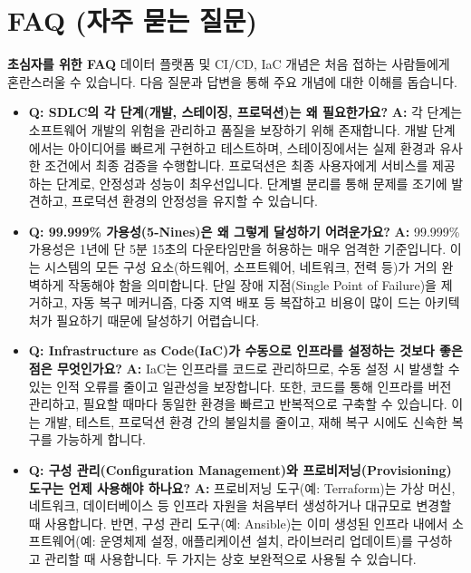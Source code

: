 \documentclass[11pt,a4paper]{article}
\begin{document}
\newpage
\section{FAQ (자주 묻는 질문)}

\begin{conceptbox}
\textbf{초심자를 위한 FAQ}
데이터 플랫폼 및 CI/CD, IaC 개념은 처음 접하는 사람들에게 혼란스러울 수 있습니다. 다음 질문과 답변을 통해 주요 개념에 대한 이해를 돕습니다.
\end{conceptbox}

\begin{itemize}
    \item \textbf{Q: SDLC의 각 단계(개발, 스테이징, 프로덕션)는 왜 필요한가요?}
    \textbf{A:} 각 단계는 소프트웨어 개발의 위험을 관리하고 품질을 보장하기 위해 존재합니다. 개발 단계에서는 아이디어를 빠르게 구현하고 테스트하며, 스테이징에서는 실제 환경과 유사한 조건에서 최종 검증을 수행합니다. 프로덕션은 최종 사용자에게 서비스를 제공하는 단계로, 안정성과 성능이 최우선입니다. 단계별 분리를 통해 문제를 조기에 발견하고, 프로덕션 환경의 안정성을 유지할 수 있습니다.

    \item \textbf{Q: 99.999\% 가용성(5-Nines)은 왜 그렇게 달성하기 어려운가요?}
    \textbf{A:} 99.999\% 가용성은 1년에 단 5분 15초의 다운타임만을 허용하는 매우 엄격한 기준입니다. 이는 시스템의 모든 구성 요소(하드웨어, 소프트웨어, 네트워크, 전력 등)가 거의 완벽하게 작동해야 함을 의미합니다. 단일 장애 지점(Single Point of Failure)을 제거하고, 자동 복구 메커니즘, 다중 지역 배포 등 복잡하고 비용이 많이 드는 아키텍처가 필요하기 때문에 달성하기 어렵습니다.

    \item \textbf{Q: Infrastructure as Code(IaC)가 수동으로 인프라를 설정하는 것보다 좋은 점은 무엇인가요?}
    \textbf{A:} IaC는 인프라를 코드로 관리하므로, 수동 설정 시 발생할 수 있는 인적 오류를 줄이고 일관성을 보장합니다. 또한, 코드를 통해 인프라를 버전 관리하고, 필요할 때마다 동일한 환경을 빠르고 반복적으로 구축할 수 있습니다. 이는 개발, 테스트, 프로덕션 환경 간의 불일치를 줄이고, 재해 복구 시에도 신속한 복구를 가능하게 합니다.

    \item \textbf{Q: 구성 관리(Configuration Management)와 프로비저닝(Provisioning) 도구는 언제 사용해야 하나요?}
    \textbf{A:} 프로비저닝 도구(예: Terraform)는 가상 머신, 네트워크, 데이터베이스 등 인프라 자원을 처음부터 생성하거나 대규모로 변경할 때 사용합니다. 반면, 구성 관리 도구(예: Ansible)는 이미 생성된 인프라 내에서 소프트웨어(예: 운영체제 설정, 애플리케이션 설치, 라이브러리 업데이트)를 구성하고 관리할 때 사용합니다. 두 가지는 상호 보완적으로 사용될 수 있습니다.


\end{itemize}
\end{document}
